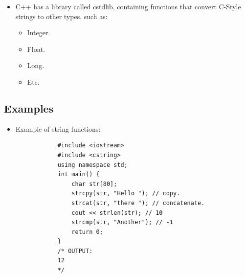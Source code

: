 \begin{itemize}
    \item C++ has a library called cstdlib, containing functions that convert C-Style strings to other types, such as:
        \begin{itemize}
            \item Integer.
            \item Float.
            \item Long.
            \item Etc.
        \end{itemize}
\end{itemize}

\subsection{Examples}
\begin{itemize}
    \item Example of string functions:
        \begin{verbatim}
            #include <iostream>
            #include <cstring>
            using namespace std;
            int main() {
                char str[80];
                strcpy(str, "Hello "); // copy.
                strcat(str, "there "); // concatenate.
                cout << strlen(str); // 10
                strcmp(str, "Another"); // -1
                return 0;
            }
            /* OUTPUT:
            12
            */
        \end{verbatim}
\end{itemize}


